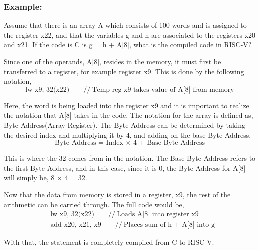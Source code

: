 \documentclass[12pt]{article}
\begin{document}
    \subsubsection*{Example:}
    \par Assume that there is an array A which consists of 100 words and is
    assigned to the register x22, and that the variables g and h are associated
    to the registers x20 and x21. If the code is C is g = h + A[8], what is the
    compiled code in RISC-V?
    \par Since one of the operands, A[8], resides in the memory, it must first
    be transferred to a register, for example register x9. This is done by the
    following notation,
    \[
        \text{lw x9, 32(x22)}\qquad //\ \text{Temp reg x9 takes value of A[8] from memory}
    \]
    \par Here, the word is being loaded into the register x9 and it is important
    to realize the notation that A[8] takes in the code. The notation for the
    array is defined as, \\ Byte Address(Array Register). The Byte
    Address can be determined by taking the desired index and multiplying it by
    4, and adding on the base Byte Address,
    \[
        \text{Byte Address = Index $\times$ 4 + Base Byte Address}
    \]
    \par This is where the 32 comes from in the notation. The Base Byte Address
    refers to the first Byte Address, and in this case, since it is 0, the Byte
    Address for A[8] will simply be, 8 $\times$ 4 = 32.
    \par Now that the data from memory is stored in a register, x9, the rest of
    the arithmetic can be carried through. The full code would be,
    \begin{align*}
        & \text{lw x9, 32(x22)}\qquad //\ \text{Loads A[8] into register x9} \\
        & \text{add x20, x21, x9}\qquad //\ \text{Places sum of h + A[8] into g}
    \end{align*}
    \par With that, the statement is completely compiled from C to RISC-V.
\end{document}
